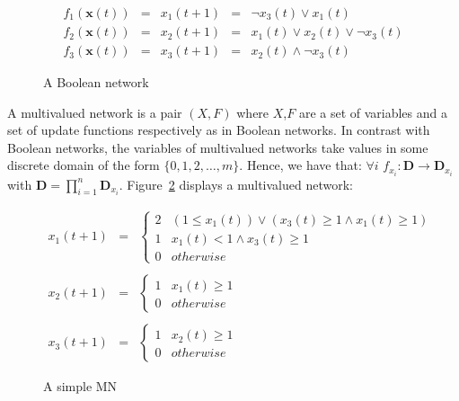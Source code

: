 \begin{figure}[h]
    \centering
   			\[
			\begin{array}{rrrcl}
				f_1(\textbf{x}(t))&=&x_1(t+1) &=& \neg x_3(t) \vee x_1(t)\\
				f_2(\textbf{x}(t))&=&x_2(t+1) &=& x_1(t) \vee x_2(t) \vee \neg x_3(t)\\
				f_3(\textbf{x}(t))&=&x_3(t+1) &=& x_2(t) \wedge \neg x_3(t)
			\end{array}
			\]
    \caption{A Boolean network}
    \label{fig:BN}
\end{figure}

A multivalued network is a pair $(X,F)$ where $X$,$F$ are a set of variables and a set of update functions respectively as in Boolean networks. In contrast with Boolean networks, the variables of multivalued networks take values in some discrete domain of the form $\{0,1,2, \ldots, m\}$. Hence, we have that: $\forall i$ $f_{x_i}:\mathbf{D} \to \mathbf{D}_{x_i}$ with $\mathbf{D}=\prod_{i=1}^n \mathbf{D}_{x_i}$. Figure~\ref{fig:MN} displays a multivalued network:
\begin{figure}[H]
    \centering
    $
    \begin{array}{ccl}
        x_1(t+1)&= &
        \begin{cases} 
            2 & (1 \leq x_1(t)) \lor (x_3(t)\geq 1 \land x_1(t)\geq 1) \\
            1 & x_1(t) < 1 \land x_3(t) \geq 1 \\
            0 & otherwise
        \end{cases}
         \\
         \\
         
         x_2(t+1)&= &
        \begin{cases} 
            1 & x_1(t)\geq 1 \\
            0 & otherwise
        \end{cases}
        
        \\
        \\
        
        x_3(t+1)&= & 
        \begin{cases} 
            1 & x_2(t)\geq 1 \\
            0 & otherwise
        \end{cases}
    \end{array}
    $
    \caption{A simple MN}
    \label{fig:MN}
\end{figure}

